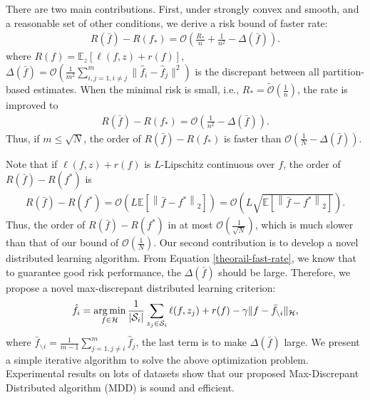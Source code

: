 \documentclass{article}
\newcommand{\argmin}{\operatornamewithlimits{arg\,min}}
\begin{document}
There are two main contributions.
First, under strongly convex and smooth, and a reasonable set of other conditions,
we derive a risk bound of faster rate:
\begin{align}
\label{theorail-fast-rate}
    R(\bar{f})-R(f_\ast)=\mathcal{O}\left(\frac{R_\ast}{n}
    +\frac{1}{n^2}
    -\Delta(\bar{f})\right).
  \end{align}
  where $R(f)=\mathbb{E}_{z}\left[\ell(f,z)+r(f)\right]$, 
  $\Delta(\bar{f})=\mathcal{O}\left(\frac{1}{m^2}\sum_{i,j=1,i\not=j}^m\|\hat{f}_i-\hat{f}_j\|^2\right)$ is the discrepant
between all partition-based estimates.
When the minimal risk is small, i.e., $R_\ast=\tilde{\mathcal{O}}\left(\frac{1}{n}\right)$,
the rate is improved to
\begin{align*}
    R(\bar{f})-R(f_\ast)=\mathcal{O}\left(\frac{1}{n^2}-\Delta(\bar{f})\right).
\end{align*}
Thus, if $m\leq \sqrt{N}$, the order of $R(\bar{f})-R(f_\ast)$ is faster than 
$
   \mathcal{O}\left(\frac{1}{N}-\Delta(\bar{f})\right).
$

Note that if $\ell(f,z)+r(f)$ is $L$-Lipschitz continuous over $f$,
the order of $R(\bar{f})-R(f^\ast)$ is
\begin{align*}
  R(\bar{f})-R(f^\ast)=\mathcal{O}\left(L\mathbb{E}\left[\left\|\bar{f}-f^\ast\right\|_2\right]\right)=\mathcal{O}\left(L\sqrt{\mathbb{E}\left[\left\|\bar{f}-f^\ast\right\|_2\right]}\right).
\end{align*}
Thus, the order of $R(\bar{f})-R(f^\ast)$ in \cite{zhang2012communication,Zhang2013,lin2017distributed}
 at most $\mathcal{O}\left({\frac{1}{\sqrt{N}}}\right)$, 
 which is much slower than that of our bound of $\mathcal{O}\left(\frac{1}{N}\right)$.
Our second contribution is to develop a novel distributed learning algorithm.
From Equation \eqref{theorail-fast-rate}, we know that to guarantee good risk performance,
the $\Delta(\bar{f})$ should be large.
Therefore, we propose a novel max-discrepant distributed learning criterion:
\begin{align*}
  \hat{f}_i=\argmin_{f\in\mathcal{H}}\frac{1}{|\mathcal{S}_i|}\sum_{z_j\in\mathcal{S}_i}\ell(f,z_j)+r(f)-\gamma \|f-\bar{f}_{\backslash i}\|_\mathcal{H},
\end{align*}
where $\bar{f}_{\backslash i}=\frac{1}{m-1}\sum_{j=1,j\not =i}^m\hat{f}_j$,
the last term is to make $\Delta(\bar{f})$ large.
We present a simple iterative algorithm to solve the above optimization problem.
Experimental results on lots of datasets show that our proposed Max-Discrepant Distributed algorithm (MDD) is sound and efficient.
\end{document}

